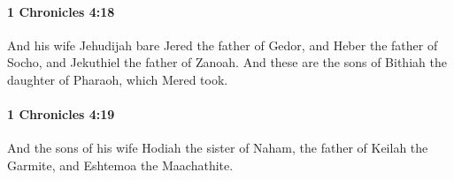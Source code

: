 		\paragraph{1 Chronicles 4:18} %
			\label{1CHRONICLES-4-18}

			And his wife Jehudijah bare Jered the father of Gedor, and Heber the father of Socho, and Jekuthiel the father of Zanoah. And these are the sons of Bithiah the daughter of Pharaoh, which Mered took.


		\paragraph{1 Chronicles 4:19} %
			\label{1CHRONICLES-4-19}

			And the sons of his wife Hodiah the sister of Naham, the father of Keilah the Garmite, and Eshtemoa the Maachathite.


